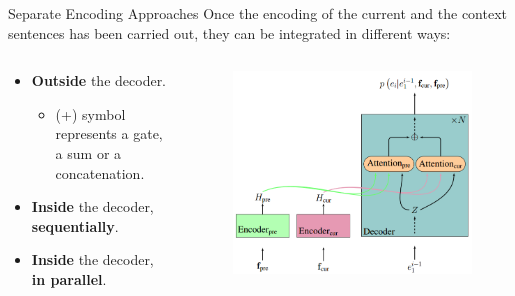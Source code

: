 \begin{frame}{Separate Encoding Approaches}
	Once the encoding of the current and the context sentences has been carried out, they can be integrated in different ways:
	\begin{columns}[T] %
		\begin{column}{.50\textwidth}
			\begin{itemize}
				\item \textbf{Outside} the decoder.
					\begin{itemize}
						\item (+) symbol represents a gate, a sum or a concatenation.
					\end{itemize}
				\item \textbf{Inside} the decoder, \textbf{sequentially}.
				\item \textbf{Inside} the decoder, \textbf{in parallel}. 
			\end{itemize}
		\end{column}%
		\hfill%
		\begin{column}{.50\textwidth}
			\begin{figure}
				\centering
				\includegraphics[width=0.90\linewidth]{Images/models_inside_decoder_parallel}
				\label{fig:modelsoutidedecoder}
			\end{figure}
		\end{column}%
	\end{columns} 
\end{frame}

